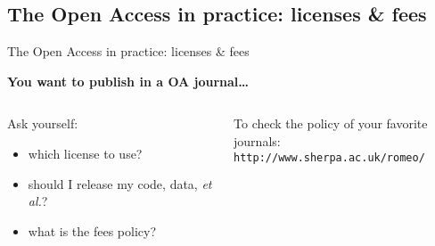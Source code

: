 \documentclass[10pt,xcolor=svgnames]{beamer}
\begin{document}
\subsection{The Open Access in practice: licenses \& fees}
\begin{frame}{The Open Access in practice: licenses \& fees}

  \textbf{You want to publish in a OA journal\ldots}
  \begin{columns}
    \begin{column}{.6\textwidth}
      \begin{block}{Ask yourself:}
        \begin{itemize}
        \item<1-> which license to use?
        \item<3-> should I release my code, data, \emph{et al.}?
        \item<4-> what is the fees policy?
        \end{itemize}
      \end{block}
    \end{column}
    \begin{column}{.4\textwidth}
      \begin{alertblock}{}
        {\small
        To check the policy of your favorite journals:\\}
        {\scriptsize
        \texttt{http://www.sherpa.ac.uk/romeo/}}
      \end{alertblock}
    \end{column}
  \end{columns}



\end{frame}
\end{document}
